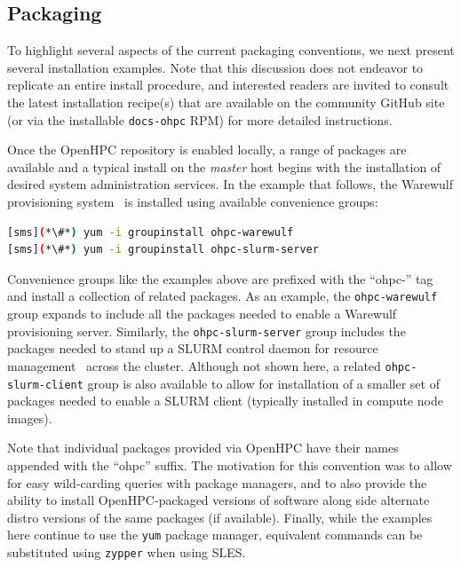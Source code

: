 \documentclass{sig-alternate-05-2015}
\begin{document}

\subsection{Packaging} \label{sec:packaging}

To highlight several aspects of the current packaging conventions, we next
present several installation examples. Note that this
discussion does not endeavor to replicate an entire install procedure, and
interested readers are invited to consult the latest installation recipe(s) that
are available on the community GitHub site (or via the installable
\texttt{docs-ohpc} RPM) for more detailed instructions.

Once the OpenHPC repository is enabled locally, a range of packages are
available and a typical install on the {\em master} host begins with the
installation of desired system administration services. In the example that
follows, the Warewulf provisioning system~\cite{warewulf_url} is installed using
available convenience groups:

\begin{lstlisting}[language=bash,keywords={}]
[sms](*\#*) yum -i groupinstall ohpc-warewulf
[sms](*\#*) yum -i groupinstall ohpc-slurm-server
\end{lstlisting}
  
Convenience groups like the examples above are prefixed with the ``ohpc-'' tag
and install a collection of related packages. As an example, the
\texttt{ohpc-warewulf} group expands to include all the packages needed to
enable a Warewulf provisioning server. Similarly, the
\texttt{ohpc-slurm-server} group includes the packages needed to stand up a
SLURM control daemon for resource management~\cite{Jette02slurm:simple} across
the cluster.  Although not shown here, a related \texttt{ohpc-slurm-client}
group is also available to allow for installation of a smaller set of packages
needed to enable a SLURM client (typically installed in compute node images).

Note that individual packages provided via OpenHPC have their names appended
with the ``ohpc'' suffix.  The motivation for this convention was to allow for
easy wild-carding queries with package managers, and to also provide the
ability to install OpenHPC-packaged versions of software along side alternate
distro versions of the same packages (if available).  Finally, while the
examples here continue to use the \texttt{yum} package manager, equivalent
commands can be substituted using \texttt{zypper} when using SLES.  \\
\end{document}

